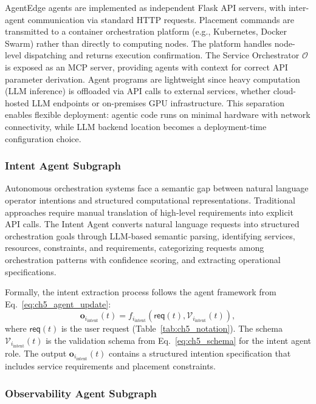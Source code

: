 \ac{AgentEdge} agents are implemented as independent Flask \ac{API} servers, with inter-agent communication via standard \ac{HTTP} requests. Placement commands are transmitted to a container orchestration platform (e.g., Kubernetes, Docker Swarm) rather than directly to computing nodes. The platform handles node-level dispatching and returns execution confirmation. The Service Orchestrator $\mathcal{O}$ is exposed as an \ac{MCP} server, providing agents with context for correct \ac{API} parameter derivation. Agent programs are lightweight since heavy computation (\ac{LLM} inference) is offloaded via \ac{API} calls to external services, whether cloud-hosted \ac{LLM} endpoints or on-premises \ac{GPU} infrastructure. This separation enables flexible deployment: agentic code runs on minimal hardware with network connectivity, while \ac{LLM} backend location becomes a deployment-time configuration choice.

\subsubsection{Intent Agent Subgraph}

Autonomous orchestration systems face a semantic gap between natural language operator intentions and structured computational representations. Traditional approaches require manual translation of high-level requirements into explicit \ac{API} calls. The Intent Agent converts natural language requests into structured orchestration goals through \ac{LLM}-based semantic parsing, identifying services, resources, constraints, and requirements, categorizing requests among orchestration patterns with confidence scoring, and extracting operational specifications.

Formally, the intent extraction process follows the agent framework from Eq.~\ref{eq:ch5_agent_update}:
\begin{equation}
\mathbf{o}_{i_{\text{intent}}}(t) = f_{i_{\text{intent}}}(\mathsf{req}(t), \mathcal{V}_{i_{\text{intent}}}(t)),
\label{eq:ch5_intent_agent}
\end{equation}
where $\mathsf{req}(t)$ is the user request (Table~\ref{tab:ch5_notation}). The schema $\mathcal{V}_{i_{\text{intent}}}(t)$ is the validation schema from Eq.~\ref{eq:ch5_schema} for the intent agent role. The output $\mathbf{o}_{i_{\text{intent}}}(t)$ contains a structured intention specification that includes service requirements and placement constraints.

\subsubsection{Observability Agent Subgraph}

